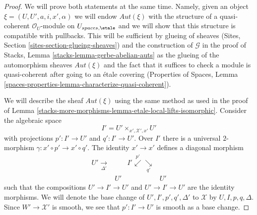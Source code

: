 \begin{proof}
We will prove both statements at the same time. Namely, given
an object $\xi = (U, U', a, i, x', \alpha)$ we will endow
$\mathit{Aut}(\xi)$ with the structure of a
quasi-coherent $\mathcal{O}_U$-module on $U_{spaces, \etale}$ and
we will show that this structure is compatible with pullbacks.
This will be sufficient by glueing of sheaves
(Sites, Section \ref{sites-section-glueing-sheaves})
and the construction of $\mathcal{G}$ in the proof of
Stacks, Lemma \ref{stacks-lemma-gerbe-abelian-auts}
as the glueing of the automorphism sheaves $\mathit{Aut}(\xi)$
and the fact that it suffices to check a module is
quasi-coherent after going to an \'etale covering
(Properties of Spaces, Lemma
\ref{spaces-properties-lemma-characterize-quasi-coherent}).

\medskip\noindent
We will describe the sheaf $\mathit{Aut}(\xi)$ using the
same method as used in the proof of
Lemma \ref{stacks-more-morphisms-lemma-etale-local-lifts-isomorphic}.
Consider the algebraic space
$$
I' = U' \times_{x', \mathcal{X}', x'} U'
$$
with projections $p' : I' \to U'$ and $q' : I' \to U'$.
Over $I'$ there is a universal $2$-morphism
$\gamma : x' \circ p' \to x' \circ q'$.
The identity $x' \to x'$ defines a diagonal morphism
$$
\begin{array}{cccc}U' \underset{\Delta'}{\longrightarrow} &  & I' \overset{p'}{\swarrow}\underset{q'}{\searrow} &  \\  & U' &  & U'\end{array}
$$
such that the compositions $U' \to I' \to U'$ and $U' \to I' \to U'$
are the identity morphisms. We will denote the base change of
$U', I', p', q', \Delta'$ to $\mathcal{X}$ by $U, I, p, q, \Delta$.
Since $W' \to \mathcal{X}'$ is smooth, we see that $p' : I' \to U'$
is smooth as a base change.


\end{proof}
